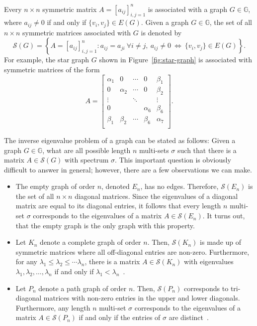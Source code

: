 \documentclass{article}
\theoremstyle{definition}
\begin{document}
Every $n\times n$ symmetric matrix $A=[a_{ij}]_{i,j=1}^{n}$ is associated with a graph $G\in\mathbb{G}$, where $a_{ij}\neq 0$ if and only if $\{v_{i},v_{j}\}\in E(G)$.
Given a graph $G\in\mathbb{G}$, the set of all $n\times n$ symmetric matrices associated with $G$ is denoted by
\[
\mathcal{S}(G) = \left\{A=[a_{ij}]_{i,j=1}^{n}\colon a_{ij}=a_{ji}~\forall i\neq j,~a_{ij}\neq 0~\Leftrightarrow~\{v_{i},v_{j}\}\in E(G)\right\}.
\]
For example, the star graph $G$ shown in Figure~\ref{fig:star-graph} is associated with symmetric matrices of the form
\[
A = \begin{bmatrix} 
		\alpha_{1} & 0 & \cdots & 0 & \beta_{1} \\
		0 & \alpha_{2} & \cdots & 0 & \beta_{2} \\
		\vdots & & \ddots & &  \vdots \\
		0 & & & \alpha_{6} & \beta_{6} \\
		\beta_{1} & \beta_{2} & \cdots & \beta_{6} & \alpha_{7} \\
	\end{bmatrix}.
\]

The inverse eigenvalue problem of a graph can be stated as follows:
Given a graph $G\in\mathbb{G}$, what are all possible length $n$ multi-sets $\sigma$ such that there is a matrix $A\in\mathcal{S}(G)$ with spectrum $\sigma$.
This important question is obviously difficult to answer in general; however, there are a few observations we can make. 
\begin{itemize}
\item  The empty graph of order $n$, denoted $E_{n}$, has no edges.
		Therefore, $\mathcal{S}(E_{n})$ is the set of all $n\times n$ diagonal matrices.
		Since the eigenvalues of a diagonal matrix are equal to its diagonal entries, it follows that every length $n$ multi-set $\sigma$ corresponds to the eigenvalues of a matrix $A\in\mathcal{S}(E_{n})$.
		It turns out, that the empty graph is the only graph with this property. 
\item Let $K_{n}$ denote a complete graph of order $n$.
		Then, $\mathcal{S}(K_{n})$ is made up of symmetric matrices where all off-diagonal entries are non-zero. 
		Furthermore, for any $\lambda_{1}\leq\lambda_{2}\leq\cdots\lambda_{n}$, there is a matrix $A\in\mathcal{S}(K_{n})$ with eigenvalues $\lambda_{1},\lambda_{2},\ldots,\lambda_{n}$ if and only if $\lambda_{1}<\lambda_{n}$~\cite{Barrett2013}.
\item Let $P_{n}$ denote a path graph of order $n$.
		Then, $\mathcal{S}(P_{n})$ corresponds to tri-diagonal matrices with non-zero entries in the upper and lower diagonals.
		Furthermore, any length $n$ multi-set $\sigma$ corresponds to the eigenvalues of a matrix $A\in\mathcal{S}(P_{n})$ if and only if the entries of $\sigma$ are distinct~\cite{Hochstadt1967}.
\end{itemize}
\end{document}
